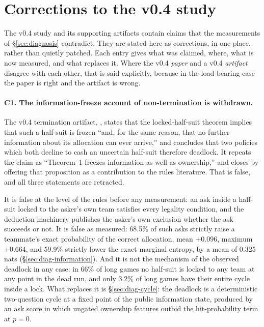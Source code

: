 \documentclass[11pt]{article}
\theoremstyle{definition}
\providecommand{\numNoLockPct}{66}
\providecommand{\numCycleInLock}{3.2}
\providecommand{\numCertRate}{68.5}
\providecommand{\numCertMean}{0.096}
\providecommand{\numCertMax}{0.664}
\providecommand{\numEntropyRate}{59.9}
\providecommand{\numEntropyMean}{0.325}
\begin{document}
\renewcommand{\topfraction}{0.7}
\renewcommand{\bottomfraction}{0.3}
\renewcommand{\textfraction}{0.2}
\renewcommand{\floatpagefraction}{0.5}
\setcounter{topnumber}{2}
\setcounter{bottomnumber}{1}
\setcounter{totalnumber}{3}
\setlength{\textfloatsep}{20pt plus 2pt minus 4pt}
\setlength{\floatsep}{12pt plus 2pt minus 2pt}
\setlength{\intextsep}{12pt plus 2pt minus 2pt}
\section{Corrections to the v0.4 study}
\label{sec:corrections}

The v0.4 study \cite{fishbot04} and its supporting artifacts contain claims that
the measurements of \S\ref{sec:diagnosis} contradict. They are stated here as
corrections, in one place, rather than quietly patched. Each entry gives what was
claimed, where, what is now measured, and what replaces it. Where the v0.4
\emph{paper} and a v0.4 \emph{artifact} disagree with each other, that is said
explicitly, because in the load-bearing case the paper is right and the artifact
is wrong.

\paragraph{C1. The information-freeze account of non-termination is withdrawn.}
The v0.4 termination artifact, ,
states that the locked-half-suit theorem implies that such a half-suit is frozen
``and, for the same reason, that no further information about its allocation can
ever arrive,'' and concludes that two policies which both decline to cash an
uncertain half-suit therefore deadlock. It repeats the claim as ``Theorem~1
freezes information as well as ownership,'' and closes by offering that
proposition as a contribution to the rules literature. That is false, and all
three statements are retracted.

It is false at the level of the rules before any measurement: an ask inside a
half-suit locked to the asker's own team satisfies every legality condition, and
the deduction machinery publishes the asker's own exclusion whether the ask
succeeds or not. It is false as measured: \numCertRate\% of such asks strictly
raise a teammate's exact probability of the correct allocation, mean
$+\numCertMean$, maximum $+\numCertMax$, and \numEntropyRate\% strictly lower the
exact marginal entropy, by a mean of \numEntropyMean{} nats
(\S\ref{sec:diag-information}). And it is not the mechanism of the observed
deadlock in any case: in \numNoLockPct\% of long games no half-suit is locked to
any team at any point in the dead run, and only \numCycleInLock\% of long games
have their entire cycle inside a lock. What replaces it is
\S\ref{sec:diag-cycle}: the deadlock is a deterministic two-question cycle at a
fixed point of the public information state, produced by an ask score in which
ungated ownership features outbid the hit-probability term at $p = 0$.
\end{document}

